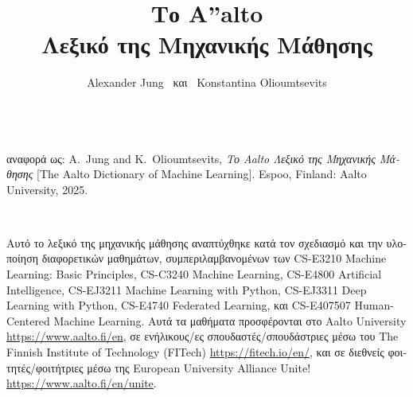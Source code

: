 \documentclass[journal,12pt,onecolumn]{article}
\begin{document}


\title {\vspace*{10mm}
	{\huge {\bf \foreignlanguage{greek}{Το} {\fontsize{40}{48}\selectfont \textbf{\textsf{A\hspace*{-2mm}''}}}\hspace*{-4mm}alto \\ \foreignlanguage{greek}{Λεξικό της Μηχανικής Μάθησης}}}  \\[-5mm] 
}

\author{\hspace{-2mm}Alexander Jung \ \foreignlanguage{greek}{και} \ Konstantina Olioumtsevits \\[-2mm]%
}

\maketitle
	\begin{center}
		\\[10mm]
{\large	\foreignlanguage{greek}{αναφορά ως}: A.\ Jung and K.\ Olioumtsevits, \textit{\foreignlanguage{greek}{Το} Aalto \foreignlanguage{greek}{Λεξικό της Μηχανικής Μάθησης}} [The Aalto Dictionary of Machine Learning]. Espoo, Finland: Aalto University, 2025.}
\end{center}

\newpage 
{}\

\noindent \foreignlanguage{greek}{Αυτό το λεξικό της μηχανικής μάθησης αναπτύχθηκε κατά τον σχεδιασμό
και την υλοποίηση διαφορετικών μαθημάτων, συμπεριλαμβανομένων των} CS-E3210 Machine Learning: 
Basic Principles, CS-C3240 Machine Learning, CS-E4800 Artificial Intelligence, CS-EJ3211 Machine Learning with 
Python, CS-EJ3311 Deep Learning with Python, CS-E4740 Federated Learning,
\foreignlanguage{greek}{και} CS-E407507 Human-Centered Machine Learning. \foreignlanguage{greek}{Αυτά τα 
μαθήματα προσφέρονται στο} Aalto University \url{https://www.aalto.fi/en}, \foreignlanguage{greek}{σε 
ενήλικους/ες σπουδαστές/σπουδάστριες μέσω του} The Finnish Institute of Technology (FITech) 
\url{https://fitech.io/en/}, \foreignlanguage{greek}{και σε διεθνείς φοιτητές/φοιτήτριες μέσω της} European University Alliance Unite! \url{https://www.aalto.fi/en/unite}.
\end{document}

